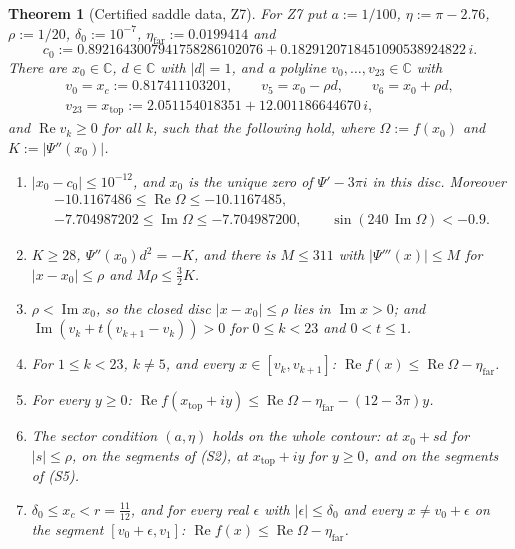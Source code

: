 \documentclass[11pt]{amsart}
\newtheorem{theorem}{Theorem}[section]
\theoremstyle{definition}
\theoremstyle{remark}
\numberwithin{equation}{section}
\newcommand{\CC}{\mathbb{C}}
\newcommand{\etafar}{\eta_{\mathrm{far}}}
\newcommand{\xtop}{x_{\mathrm{top}}}
\renewcommand{\Re}{\operatorname{Re}}
\renewcommand{\Im}{\operatorname{Im}}
\begin{document}
\begin{theorem}[Certified saddle data, Z7]\label{thm:saddle}
For Z7 put $a:=1/100$, $\eta:=\pi-2.76$, $\rho:=1/20$, $\delta_0:=10^{-7}$, $\etafar:=0.0199414$ and
\[
  c_0:=0.8921643007941758286102076+0.1829120718451090538924822\,i .
\]
There are $x_0\in\CC$, $d\in\CC$ with $|d|=1$, and a polyline $v_0,\dots,v_{23}\in\CC$ with
\begin{gather*}
  v_0=x_c:=0.817411103201,\qquad v_5=x_0-\rho d,\qquad v_6=x_0+\rho d,\\
  v_{23}=\xtop:=2.051154018351+12.001186644670\,i,
\end{gather*}
and $\Re v_k\ge0$ for all $k$, such that the following hold, where $\Omega:=f(x_0)$ and $K:=|\Psi''(x_0)|$.
\begin{enumerate}
\item[(S0)] $|x_0-c_0|\le10^{-12}$, and $x_0$ is the unique zero of $\Psi'-3\pi i$ in this disc. Moreover
  \begin{gather*}
    -10.1167486\le\Re\Omega\le-10.1167485,\\
    -7.704987202\le\Im\Omega\le-7.704987200,\qquad
    \sin(240\,\Im\Omega)<-0.9 .
  \end{gather*}
\item[(S1)] $K\ge28$, $\Psi''(x_0)d^2=-K$, and there is $M\le311$ with $|\Psi'''(x)|\le M$ for $|x-x_0|\le\rho$ and
  $M\rho\le\frac32K$.
\item[(S1$'$)] $\rho<\Im x_0$, so the closed disc $|x-x_0|\le\rho$ lies in $\Im x>0$; and
  $\Im(v_k+t(v_{k+1}-v_k))>0$ for $0\le k<23$ and $0<t\le1$.
\item[(S2)] For $1\le k<23$, $k\ne5$, and every $x\in[v_k,v_{k+1}]$: $\Re f(x)\le\Re\Omega-\etafar$.
\item[(S3)] For every $y\ge0$: $\Re f(\xtop+iy)\le\Re\Omega-\etafar-(12-3\pi)y$.
\item[(S4)] The sector condition $(a,\eta)$ holds on the whole contour: at $x_0+sd$ for $|s|\le\rho$, on the
  segments of (S2), at $\xtop+iy$ for $y\ge0$, and on the segments of (S5).
\item[(S5)] $\delta_0\le x_c<r=\frac{11}{12}$, and for every real $\epsilon$ with $|\epsilon|\le\delta_0$ and every
  $x\ne v_0+\epsilon$ on the segment $[v_0+\epsilon,v_1]$: $\Re f(x)\le\Re\Omega-\etafar$.
\end{enumerate}
\end{theorem}
\end{document}
